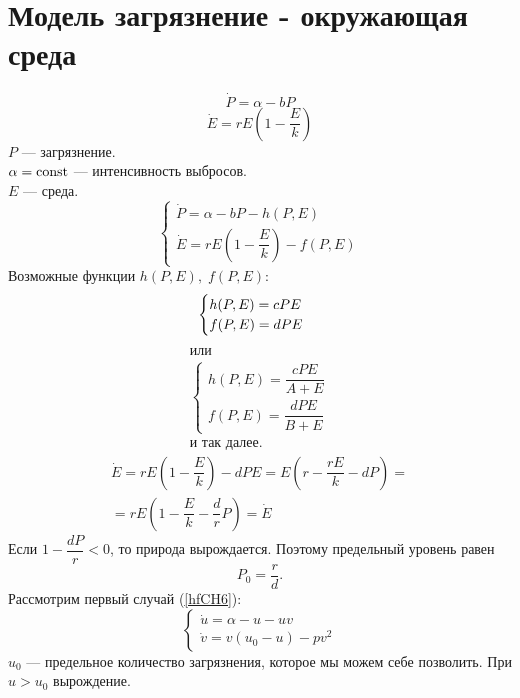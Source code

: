 \section{Модель загрязнение - окружающая среда}
\begin{equation}
\dot{P} = \alpha - bP
\end{equation}
\begin{equation}
\dot{E} = rE\left(1 - \dfrac{E}{k} \right)
\end{equation}
$P$ --- загрязнение.\\
$\alpha = \operatorname{const}$ --- интенсивность выбросов.\\
$E$ --- среда.
\begin{equation}
\begin{cases}
\dot{P} = \alpha - bP - h(P, E)\\
\dot{E} = rE\left(1 - \dfrac{E}{k} \right) - f(P,E)
\end{cases}
\end{equation}
Возможные функции $h(P,E),\; f(P,E)$:
\begin{equation}
\begin{cases}\label{hfCH6}
h(P,E) = cPE\\
f(P,E) = dPE
\end{cases}\\
\end{equation}
\begin{gather*}
\text{или}\\
\begin{cases}
h(P,E) = \dfrac{cPE}{A + E}\\[8pt]
f(P,E) = \dfrac{dPE}{B + E}
\end{cases}\\
\text{и так далее.}
\end{gather*}
\begin{gather*}
\dot{E} = rE( 1 - \dfrac{E}{k}) - dPE = E(r - \dfrac{rE}{k} - dP) = \\
=rE(1 - \dfrac{E}{k} - \dfrac{d}{r}P) = \dot{E}
\end{gather*}
Если $1 - \dfrac{dP}{r} < 0$, то природа вырождается. Поэтому предельный уровень равен
$$P_0 = \dfrac{r}{d}.$$
Рассмотрим первый случай (\ref{hfCH6}):
\begin{equation}
\begin{cases}
\dot{u} = \alpha - u - uv\\
\dot{v} = v(u_0 - u) - pv^2
\end{cases}
\end{equation}
$u_0$ --- предельное количество загрязнения, которое мы можем себе позволить. При $u > u_0$ вырождение.
